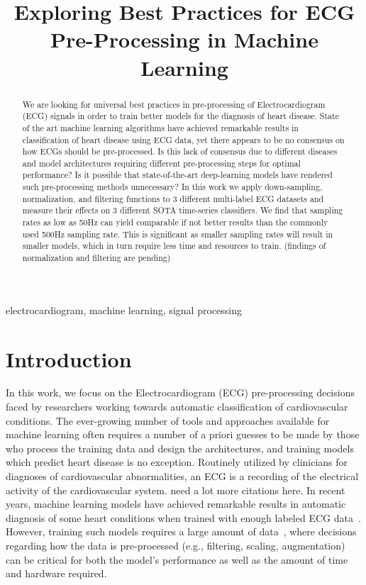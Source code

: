 \documentclass[pmlr,twocolumn]{jmlr}%
\title[ECG Scaling]{Exploring Best Practices for ECG Pre-Processing in Machine Learning}
\author{\Name{Amir Salimi} \Email{{asalimi@ualberta.ca}\\
\Name{Abram Hindle} \Email{abram.hindle@ualberta.ca}\\
\Name{Osmar Zaiane} \Email{zaiane@ualberta.ca}\\
\Name{others} \Email{CVC@ualberta.ca}\\
\addr University of Alberta}}
\begin{document}
\maketitle

\begin{abstract}
We are looking for universal best practices in pre-processing of Electrocardiogram (ECG) signals in order to train better models for the diagnosis of heart disease.
State of the art machine learning algorithms have achieved remarkable results in classification of heart disease using ECG data, yet there appears to be no consensus on how ECGs should be pre-processed.  Is this lack of consensus due to different diseases and model architectures requiring different pre-processing steps for optimal performance? Is it possible that state-of-the-art deep-learning models have rendered such pre-processing methods unnecessary? In this work we apply down-sampling, normalization, and filtering functions to 3 different multi-label ECG datasets and measure their effects on 3 different SOTA time-series classifiers. We find that sampling rates as low as 50Hz can yield comparable if not better results than the commonly used 500Hz sampling rate. This is significant as smaller sampling rates will result in smaller models, which in turn require less time and resources to train. (findings of normalization and filtering are pending)

\end{abstract}
\begin{keywords}
electrocardiogram, machine learning, signal processing
\end{keywords}


\section{Introduction}
\label{sec:intro}
In this work, we focus on the Electrocardiogram (ECG) pre-processing decisions faced by researchers working towards automatic classification of cardiovascular conditions. The ever-growing number of tools and approaches available for machine learning often requires a number of a priori guesses to be made by those who process the training data and design the architectures, and training models which predict heart disease is no exception.
Routinely utilized by clinicians for diagnoses of cardiovascular abnormalities, an ECG is a recording of the electrical activity of the cardiovascular system. {\color{red} need a lot more citations here}. In recent years, machine learning models have achieved remarkable results in automatic diagnosis of some heart conditions when trained with enough labeled ECG data~\cite{reyna2021will,reyna4issues}. However, training such models requires a large amount of data~\cite{reyna2021will,reyna4issues,natarajan2020wide,ribeiro2020automatic}, where decisions regarding how the data is pre-processed (e.g., filtering, scaling, augmentation) can be critical for both the model's performance as well as the amount of time and hardware required. 
\end{document}
